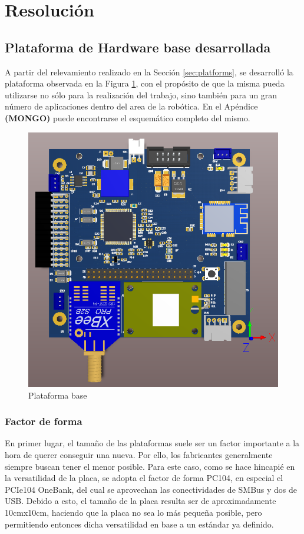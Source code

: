 \section{Resolución}
\subsection{Plataforma de Hardware base desarrollada}
A partir del relevamiento realizado en la Sección \ref{sec:platforms}, se desarrolló la plataforma observada en la Figura \ref{fig:baseboardv2_1}, con el propósito de que la misma pueda utilizarse no sólo para la realización del trabajo, sino también para un gran número de aplicaciones dentro del area de la robótica. En el Apéndice \textbf{(MONGO)} puede encontrarse el esquemático completo del mismo.

\begin{figure}[!ht]
    \centering
    \includegraphics[width=\textwidth]{Img/BaseBoardV2_1.png}
    \caption{Plataforma base}
    \label{fig:baseboardv2_1}
\end{figure}

\subsubsection{Factor de forma}
En primer lugar, el tamaño de las plataformas suele ser un factor importante a la hora de querer conseguir una nueva. Por ello, los fabricantes generalmente siempre buscan tener el menor posible. Para este caso, como se hace hincapié en la versatilidad de la placa, se adopta el factor de forma PC104, en especial el PCIe104 OneBank, del cual se aprovechan las conectividades de SMBus y dos de USB. Debido a esto, el tamaño de la placa resulta ser de aproximadamente 10cmx10cm, haciendo que la placa no sea lo más pequeña posible, pero permitiendo entonces dicha versatilidad en base a un estándar ya definido.

